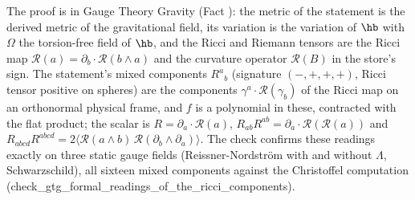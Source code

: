 The proof is in Gauge Theory Gravity (Fact ): the metric of the statement is the derived metric of the gravitational field, its variation is the variation of $\hb$ with $\Omega$ the torsion-free field of $\hb$, and the Ricci and Riemann tensors are the Ricci map $\mathcal{R}(a) = \partial_{b} \cdot \mathcal{R}(b \wedge a)$ and the curvature operator $\mathcal{R}(B)$ in the store's sign. The statement's mixed components $R^{a}{}_{b}$ (signature $(-,+,+,+)$, Ricci tensor positive on spheres) are the components $\gamma^{a} \cdot \mathcal{R}(\gamma_{b})$ of the Ricci map on an orthonormal physical frame, and $f$ is a polynomial in these, contracted with the flat product; the scalar is $R = \partial_{a} \cdot \mathcal{R}(a)$, $R_{ab}R^{ab} = \partial_{a} \cdot \mathcal{R}(\mathcal{R}(a))$ and $R_{abcd}R^{abcd} = 2\langle\mathcal{R}(a \wedge b)\,\mathcal{R}(\partial_{b} \wedge \partial_{a})\rangle$. The check confirms these readings exactly on three static gauge fields (Reissner-Nordstr\"om with and without $\Lambda$, Schwarzschild), all sixteen mixed components against the Christoffel computation (check\_gtg\_formal\_readings\_of\_the\_ricci\_components).

